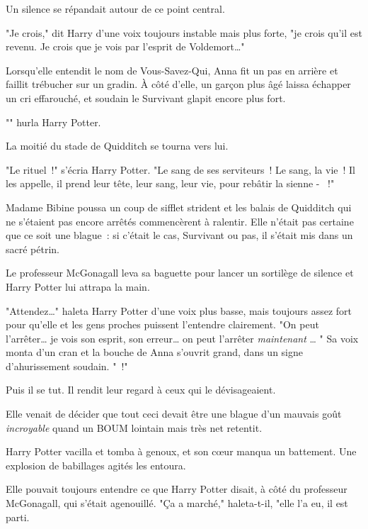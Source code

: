 Un silence se répandait autour de ce point central.

"Je crois," dit Harry d'une voix toujours instable mais plus forte, "je crois qu'il est revenu. Je crois que je vois par l'esprit de Voldemort…"

Lorsqu'elle entendit le nom de Vous-Savez-Qui, Anna fit un pas en arrière et faillit trébucher sur un gradin. À côté d'elle, un garçon plus âgé laissa échapper un cri effarouché, et soudain le Survivant glapit encore plus fort.

"" hurla Harry Potter.

La moitié du stade de Quidditch se tourna vers lui.

"Le rituel~!" s'écria Harry Potter. "Le sang de ses serviteurs~! Le sang, la vie~! Il les appelle, il prend leur tête, leur sang, leur vie, pour rebâtir la sienne - ~!"

Madame Bibine poussa un coup de sifflet strident et les balais de Quidditch qui ne s'étaient pas encore arrêtés commencèrent à ralentir. Elle n'était pas certaine que ce soit une blague~: si c'était le cas, Survivant ou pas, il s'était mis dans un sacré pétrin.

Le professeur McGonagall leva sa baguette pour lancer un sortilège de silence et Harry Potter lui attrapa la main.

"Attendez…" haleta Harry Potter d'une voix plus basse, mais toujours assez fort pour qu'elle et les gens proches puissent l'entendre clairement. "On peut l'arrêter… je vois son esprit, son erreur… on peut l'arrêter \emph{maintenant} … " Sa voix monta d'un cran et la bouche de Anna s'ouvrit grand, dans un signe d'ahurissement soudain. "~!"

Puis il se tut. Il rendit leur regard à ceux qui le dévisageaient.

Elle venait de décider que tout ceci devait être une blague d'un mauvais goût \emph{incroyable} quand un BOUM lointain mais très net retentit.

Harry Potter vacilla et tomba à genoux, et son cœur manqua un battement. Une explosion de babillages agités les entoura.

Elle pouvait toujours entendre ce que Harry Potter disait, à côté du professeur McGonagall, qui s'était agenouillé. "Ça a marché," haleta-t-il, "elle l'a eu, il est parti.

